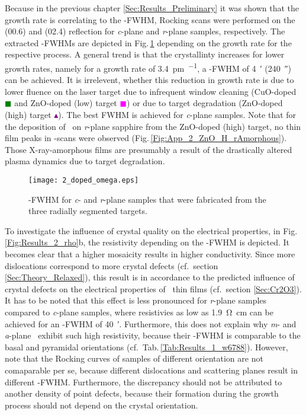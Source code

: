 Because in the previous chapter \ref{Sec:Results_Preliminary} it was shown that the growth rate is correlating to the \textomega-FWHM, Rocking scans were performed on the (00.6) and (02.4) reflection for \textit{c}-plane and \textit{r}-plane samples, respectively.
The extracted \textomega-FWHMs are depicted in Fig.\,\ref{Fig:Results_2_omega} depending on the growth rate for the respective process.
A general trend is that the crystallinty increases for lower growth rates, namely for a growth rate of \qty{3.4}{\pm\per\pulse}, a \textomega-FWHM of \qty{4}{\arcminute} (\qty{240}{\arcsecond}) can be achieved.
It is irrelevent, whether this reduction in growth rate is due to lower fluence on the laser target due to infrequent window cleaning (CuO-doped \textcolor{green}{$\blacksquare$} and ZnO-doped (low) target \textcolor{magenta}{$\blacksquare$}) or due to target degradation (ZnO-doped (high) target \textcolor{purple}{$\blacktriangle$}).
The best FWHM is achieved for \textit{c}-plane samples.
Note that for the deposition of \cro\ on \textit{r}-plane sapphire from the ZnO-doped (high) target, no thin film peaks in \thetaomega-scans were observed (Fig.\,\ref{Fig:App_2_ZnO_H_rAmorphous}).
Those X-ray-amorphous films are presumably a result of the drastically altered plasma dynamics due to target degradation.
\begin{figure}
    \centering
    \texttt{[image: 2\_doped\_omega.eps]}
    \caption{\textomega-FWHM for \textit{c}- and \textit{r}-plane samples that were fabricated from the three radially segmented targets.}
    \label{Fig:Results_2_omega}
\end{figure}

{%
\sloppy
To investigate the influence of crystal quality on the electrical properties, in Fig.\,\ref{Fig:Results_2_rho}b, the resistivity depending on the \textomega-FWHM is depicted. %
It becomes clear that a higher mosaicity results in higher conductivity.
Since more dislocations correspond to more crystal defects (cf.\ section \ref{Sec:Theory_Relaxed}), this result is in accordance to the predicted influence of crystal defects on the electrical properties of \cro\ thin films (cf.\ section \ref{Sec:Cr2O3}).
It has to be noted that this effect is less pronounced for \textit{r}-plane samples compared to \textit{c}-plane samples, where resistivies as low as \qty{1.9}{\ohm\cm} can be achieved for an \textomega-FWHM of \qty{40}{\arcminute}.
Furthermore, this does not explain why \textit{m}- and \textit{a}-plane \cro\ exhibit such high resistivity, because their \textomega-FWHM is comparable to the basal and pyramidal orientations (cf.\ Tab.\,\ref{Tab:Results_1_w6788}).
However, note that the Rocking curves of samples of different orientation are not comaparable per se, because different dislocations and scattering planes result in different \textomega-FWHM.
Furthermore, the discrepancy should not be attributed to another density of point defects, because their formation during the growth process should not depend on the crystal orientation.
\par}

